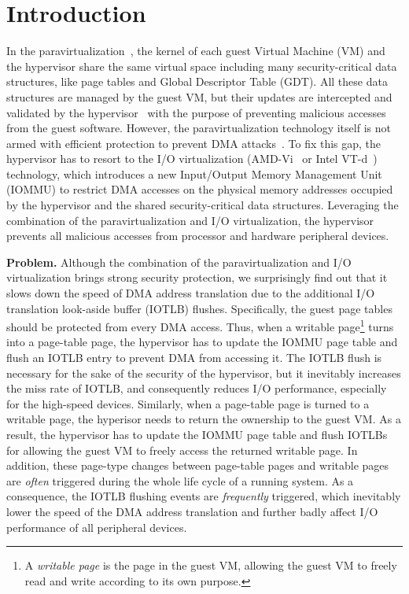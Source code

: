 \section{Introduction} \label{sec:intro}
In the paravirtualization~\cite{XEN-SOSP03,denali-paravirtualization}, the kernel of each guest Virtual Machine (VM) and the hypervisor share the same virtual space including many security-critical data structures, like page tables and Global Descriptor Table (GDT). All these data structures are managed by the guest VM, but their updates are intercepted and validated by the hypervisor~\cite{XEN-SOSP03} with the purpose of preventing malicious accesses from the guest software.
However, the paravirtualization technology itself is not armed with efficient protection to prevent DMA attacks~\cite{disaggregation}.
To fix this gap, the hypervisor has to resort to the I/O virtualization (AMD-Vi~\cite{amdvt} or Intel VT-d~\cite{intelvt}) technology, which introduces a new Input/Output Memory Management Unit (IOMMU) to restrict DMA accesses on the physical memory addresses occupied by the hypervisor and the shared security-critical data structures.
Leveraging the combination of the paravirtualization and I/O virtualization, the hypervisor prevents all malicious accesses from processor and hardware peripheral devices.

\textbf{Problem.} Although the combination of the paravirtualization and I/O virtualization brings strong security protection, we surprisingly find out that it slows down the speed of DMA address translation due to the additional I/O translation look-aside buffer (IOTLB) flushes.
Specifically, the guest page tables should be protected from every DMA access.
Thus, when a writable page\footnote{A \emph{writable page} is the page in the guest VM, allowing the guest VM to freely read and write according to its own purpose.} turns into a page-table page, the hypervisor has to update the IOMMU page table and flush an IOTLB entry to prevent DMA from accessing it.
The IOTLB flush is necessary for the sake of the security of the hypervisor, but it inevitably increases the miss rate of IOTLB, and consequently reduces I/O performance, especially for the high-speed devices.
Similarly, when a page-table page is turned to a writable page, the hyperisor needs to return the ownership to the guest VM.
As a result, the hypervisor has to update the IOMMU page table and flush IOTLBs for allowing the guest VM to freely access the returned writable page.
In addition, these page-type changes between page-table pages and writable pages are \emph{often} triggered during the whole life cycle of a running system.
As a consequence, the IOTLB flushing events are \emph{frequently} triggered, which inevitably lower the speed of the DMA address translation and further badly affect I/O performance of all peripheral devices.

